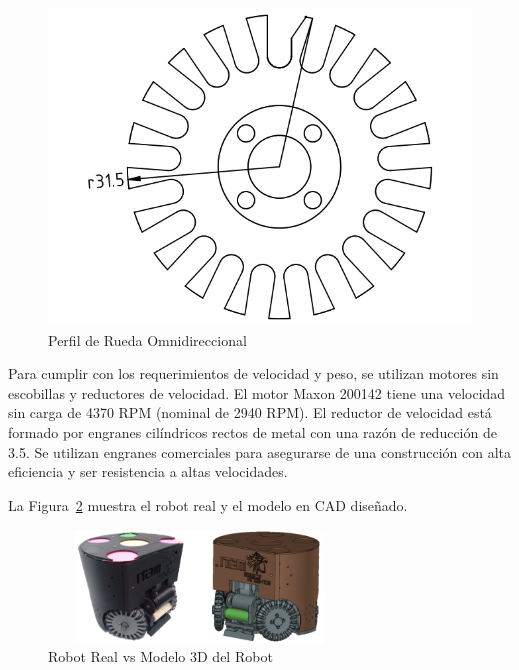 \documentclass[twocolumn,10pt]{amrob}
\begin{document}
\begin{figure}[t]
  \centering
    \includegraphics[scale=0.1]{rueda.png}
  \caption{Perfil de Rueda Omnidireccional}
  \label{fig:ruedaOmni}
\end{figure}

Para cumplir con los requerimientos de velocidad y peso, se utilizan motores sin escobillas y reductores de velocidad. El motor Maxon 200142 tiene una velocidad sin carga de 4370 RPM (nominal de 2940 RPM). El reductor de velocidad está formado por engranes cilíndricos rectos de metal con una razón de reducción de 3.5. Se utilizan engranes comerciales para asegurarse de una construcción con alta eficiencia y ser resistencia a altas velocidades.

La Figura~\ref{fig:ModRealVsdes} muestra el robot real y el modelo en CAD diseñado.
\begin{figure}
  \centering
    \includegraphics[height=3cm,width=8cm]{realVS3D.png}
  \caption{Robot Real vs Modelo 3D del Robot}
  \label{fig:ModRealVsdes}
\end{figure}
\end{document}

